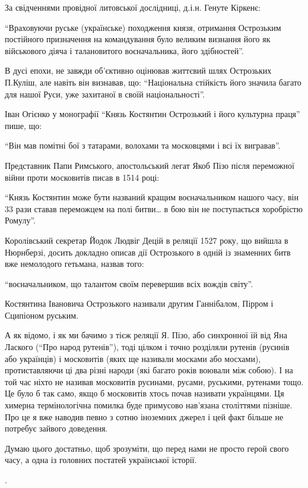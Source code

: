 За свідченнями провідної литовської дослідниці, д.і.н. Генуте Кіркенє: 

\enquote{Враховуючи руське (українське) походження князя, отримання Острозьким
постійного призначення на командування було великим визнання його як
військового діяча і талановитого воєначальника, його здібностей}.

В дусі епохи, не завжди об’єктивно оцінював життєвий шлях Острозьких П.Куліш,
але навіть він визнавав, що: \enquote{Національна стійкість його значила багато для
нашої Руси, уже захитаної в своїй національності}.

Іван Огієнко у монографії \enquote{Князь Костянтин Острозький і його культурна праця}
пише, що: 

\enquote{Він мав помітні бої з татарами, волохами та московцями і всі їх вигравав}.

Представник Папи Римського, апостольський легат Якоб Пізо після переможної
війни проти московитів писав в 1514 році: 

\enquote{Князь Костянтин може бути названий кращим воєначальником нашого часу, він 33
рази ставав переможцем на полі битви… в бою він не поступається хоробрістю
Ромулу}. 

Королівський секретар Йодок Людвіг Децій в реляції 1527 року, що вийшла в
Нюрнберзі, досить докладно описав дії Острозького в одній із знаменних битв вже
немолодого гетьмана, назвав того:

\enquote{воєначальником, що талантом своїм перевершив всіх вождів світу}.

Костянтина Івановича Острозького називали другим Ганнібалом, Пірром і Сципіоном
руським. 

А як відомо, і як ми бачимо з тієж реляції Я. Пізо, або синхронної їй від Яна
Лаского (\enquote{Про народ рутенів}), тоді цілком і точно розділяли рутенів (русинів
або українців) і московитів (яких ще називали москами або мосхами),
протиставляючи ці два різні народи (які багато років воювали між собою). І на
той час ніхто не називав московитів русинами, русами, руськими, рутенами тощо.
Це було б так само, якщо б московитів хтось почав називати українцями. Ця
химерна термінологічна помилка буде примусово нав’язана століттями пізніше. Про
це я вже наводив певно з сотню іноземних джерел і цей факт більше не потребує
зайвого доведення.

Думаю цього достатньо, щоб зрозуміти, що перед нами не просто герой свого часу,
а одна із головних постатей української історії.

.

